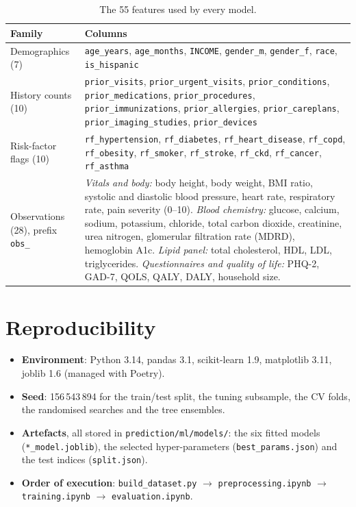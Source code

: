 \documentclass[11pt,a4paper]{article}
\newcommand{\code}[1]{\texttt{\textcolor{codegrey}{#1}}}
\newcommand{\sect}[1]{\section{#1}}
\begin{document}
\begin{table}[H]
\centering\small
\caption{The 55 features used by every model.}
\begin{tabular}{@{}lp{10.6cm}@{}}
\toprule
\textbf{Family} & \textbf{Columns} \\
\midrule
Demographics (7) &
  \code{age\_years}, \code{age\_months}, \code{INCOME}, \code{gender\_m}, \code{gender\_f},
  \code{race}, \code{is\_hispanic} \\
\addlinespace
History counts (10) &
  \code{prior\_visits}, \code{prior\_urgent\_visits}, \code{prior\_conditions},
  \code{prior\_medications}, \code{prior\_procedures}, \code{prior\_immunizations},
  \code{prior\_allergies}, \code{prior\_careplans}, \code{prior\_imaging\_studies},
  \code{prior\_devices} \\
\addlinespace
Risk-factor flags (10) &
  \code{rf\_hypertension}, \code{rf\_diabetes}, \code{rf\_heart\_disease}, \code{rf\_copd},
  \code{rf\_obesity}, \code{rf\_smoker}, \code{rf\_stroke}, \code{rf\_ckd}, \code{rf\_cancer},
  \code{rf\_asthma} \\
\addlinespace
Observations (28), prefix \code{obs\_} &
  \emph{Vitals and body:} body height, body weight, BMI ratio, systolic and diastolic blood
  pressure, heart rate, respiratory rate, pain severity (0--10). \newline
  \emph{Blood chemistry:} glucose, calcium, sodium, potassium, chloride, total carbon dioxide,
  creatinine, urea nitrogen, glomerular filtration rate (MDRD), hemoglobin A1c. \newline
  \emph{Lipid panel:} total cholesterol, HDL, LDL, triglycerides. \newline
  \emph{Questionnaires and quality of life:} PHQ-2, GAD-7, QOLS, QALY, DALY, household size. \\
\bottomrule
\end{tabular}
\end{table}

\sect{Reproducibility}

\begin{itemize}[itemsep=2pt]
  \item \textbf{Environment}: Python 3.14, pandas 3.1, scikit-learn 1.9, matplotlib 3.11,
        joblib 1.6 (managed with Poetry).
  \item \textbf{Seed}: 156\,543\,894 for the train/test split, the tuning subsample, the CV folds,
        the randomised searches and the tree ensembles.
  \item \textbf{Artefacts}, all stored in \code{prediction/ml/models/}: the six fitted models
        (\code{*\_model.joblib}), the selected hyper-parameters (\code{best\_params.json})
        and the test indices (\code{split.json}).
  \item \textbf{Order of execution}: \code{build\_dataset.py} $\rightarrow$
        \code{preprocessing.ipynb} $\rightarrow$ \code{training.ipynb} $\rightarrow$
        \code{evaluation.ipynb}.
\end{itemize}
\end{document}
